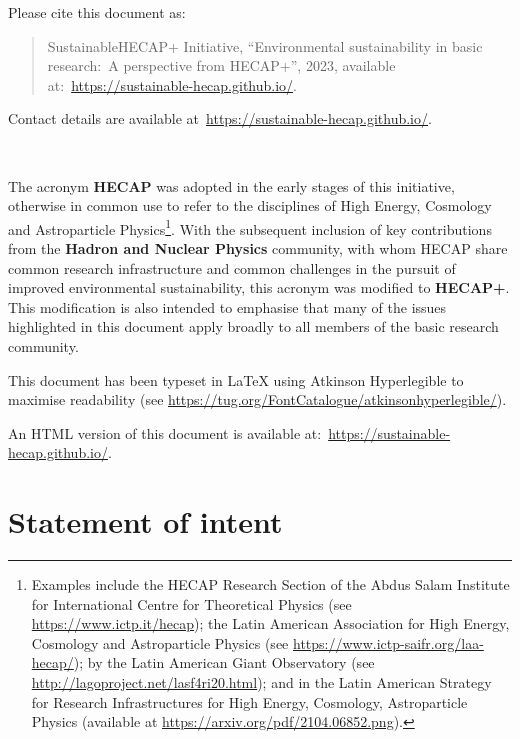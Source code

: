 \documentclass[../SustainableHEP.tex]{subfiles}
\begin{document}
\noindent Please cite this document as:
\begin{quotation}
    SustainableHECAP+ Initiative, ``Environmental sustainability in basic research:\ A perspective from HECAP+'', 2023, available at:~\url{https://sustainable-hecap.github.io/}.
\end{quotation}

\noindent Contact details are available at~\url{https://sustainable-hecap.github.io/}.

\newpage

\thispagestyle{empty}

~

\vspace{10em}
\RaggedRight

\noindent The acronym {\bf HECAP} was adopted in the early stages of this initiative, otherwise in common use to refer to the disciplines of High Energy, Cosmology and Astroparticle Physics\footnote{Examples include the HECAP Research Section of the Abdus Salam Institute for International Centre for Theoretical Physics (see \url{https://www.ictp.it/hecap}); the Latin American Association for High Energy, Cosmology and Astroparticle Physics (see \url{https://www.ictp-saifr.org/laa-hecap/}); by the Latin American Giant Observatory (see \url{http://lagoproject.net/lasf4ri20.html}); and in the Latin American Strategy for Research Infrastructures for High Energy, Cosmology, Astroparticle Physics (available at \url{https://arxiv.org/pdf/2104.06852.png}).}. With the subsequent inclusion of key contributions from the \textbf{Hadron and Nuclear Physics} community, with whom HECAP share common research infrastructure and common challenges in the pursuit of improved environmental sustainability, this acronym was modified to {\bf HECAP+}. This modification is also intended to emphasise that many of the issues highlighted in this document apply broadly to all members of the basic research community.

\vspace{10em}

\noindent This document has been typeset in LaTeX using Atkinson Hyperlegible to maximise readability (see \url{https://tug.org/FontCatalogue/atkinsonhyperlegible/}).

\noindent An HTML version of this document is available at:~\url{https://sustainable-hecap.github.io/}.

\newpage

\thispagestyle{empty}

\section*{Statement of intent}
    
\end{document}
